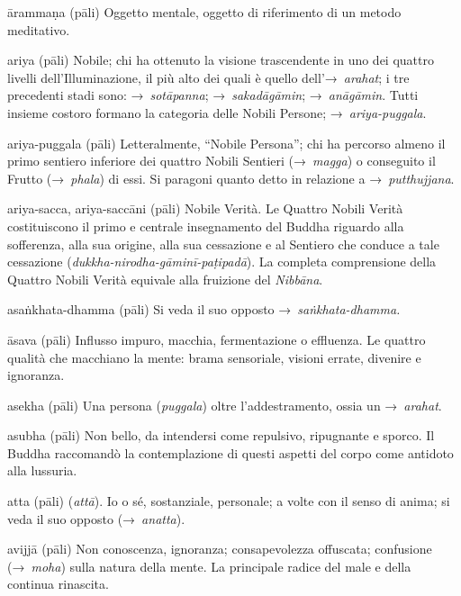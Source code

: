 \begin{glossarydescription}
\item[ārammaṇa] (pāli) Oggetto mentale, oggetto di riferimento di un metodo
  meditativo.

\item[ariya] (pāli) Nobile; chi ha ottenuto la visione trascendente in uno dei
  quattro livelli dell'Illuminazione, il più alto dei quali è quello
  dell'→~\emph{arahat}; i tre precedenti stadi sono: →~\emph{sotāpanna};
  →~\emph{sakadāgāmin}; →~\emph{anāgāmin}. Tutti insieme costoro formano la
  categoria delle Nobili Persone; →~\emph{ariya-puggala}.

\item[ariya-puggala] (pāli) Letteralmente, ``Nobile Persona''; chi ha percorso
  almeno il primo sentiero inferiore dei quattro Nobili Sentieri
  (→~\emph{magga}) o conseguito il Frutto (→~\emph{phala}) di essi. Si paragoni
  quanto detto in relazione a →~\emph{putthujjana}.

\item[ariya-sacca, ariya-saccāni] (pāli) Nobile Verità. Le Quattro Nobili Verità
  costituiscono il primo e centrale insegnamento del Buddha riguardo alla
  sofferenza, alla sua origine, alla sua cessazione e al Sentiero che conduce a
  tale cessazione (\emph{dukkha-nirodha-gāminī-paṭipadā}). La completa
  comprensione della Quattro Nobili Verità equivale alla fruizione del
  \emph{Nibbāna}.

\item[asaṅkhata-dhamma] (pāli) Si veda il suo opposto →~\emph{saṅkhata-dhamma.}

\item[āsava] (pāli) Influsso impuro, macchia, fermentazione o effluenza. Le
  quattro qualità che macchiano la mente: brama sensoriale, visioni errate,
  divenire e ignoranza.

\item[asekha] (pāli) Una persona (\emph{puggala}) oltre l'addestramento, ossia
  un →~\emph{arahat}.

\item[asubha] (pāli) Non bello, da intendersi come repulsivo, ripugnante e
  sporco. Il Buddha raccomandò la contemplazione di questi aspetti del corpo
  come antidoto alla lussuria.

\item[atta] (pāli) (\emph{attā}). Io o sé, sostanziale, personale; a volte con
  il senso di anima; si veda il suo opposto (→~\emph{anatta}).

\item[avijjā] (pāli) Non conoscenza, ignoranza; consapevolezza offuscata;
  confusione (→~\emph{moha}) sulla natura della mente. La principale radice del
  male e della continua rinascita.


\end{glossarydescription}
